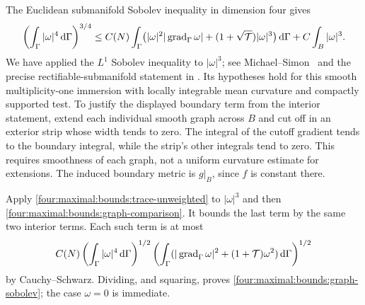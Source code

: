 The Euclidean submanifold Sobolev inequality in dimension four gives
\[
 \left(\int_\Gamma |\omega|^4\,\mathrm d\Gamma\right)^{3/4}
 \le C(N)\int_\Gamma
    \bigl(|\omega|^2|\operatorname{grad}_\Gamma\omega|
               +(1+\sqrt{\mathcal T})|\omega|^3\bigr)\,\mathrm d\Gamma
           +C\int_B|\omega|^3.
\]
We have applied the $L^1$ Sobolev inequality to $|\omega|^3$;
see Michael--Simon~\cite{MichaelSimon1973} and the precise
rectifiable-submanifold statement in
\cite[Chapter~4, \S5, Theorem~5.7, p.~98]{Simon2014}.
Its hypotheses hold for this smooth multiplicity-one immersion with
locally integrable mean curvature and compactly supported test.
To justify the displayed boundary term from the interior statement,
extend each individual smooth graph across $B$ and cut off in an
exterior strip whose width tends to zero. The integral of the cutoff
gradient tends to the boundary integral, while the strip's other
integrals tend to zero. This requires smoothness of each graph, not a
uniform curvature estimate for extensions. The induced boundary
metric is $g|_B$, since $f$ is constant there.

Apply \eqref{four:maximal:bounds:trace-unweighted} to $|\omega|^3$ and then
\eqref{four:maximal:bounds:graph-comparison}. It bounds the last term by the same
two interior terms. Each such term is at most
\[
 C(N)\left(\int_\Gamma|\omega|^4\,\mathrm d\Gamma\right)^{1/2}
 \left(\int_\Gamma
       (|\operatorname{grad}_\Gamma\omega|^2+(1+\mathcal T)\omega^2)\,\mathrm d\Gamma\right)^{1/2}
\]
by Cauchy--Schwarz. Dividing, and squaring, proves
\eqref{four:maximal:bounds:graph-sobolev}; the case $\omega=0$ is immediate.

